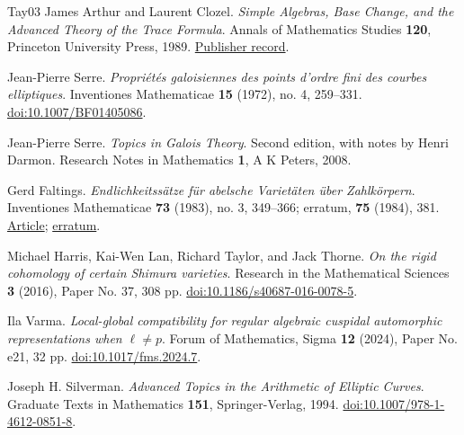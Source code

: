 \documentclass[11pt,a4paper]{article}
\numberwithin{equation}{section}
\begin{document}
\begin{thebibliography}{Tay03}
James Arthur and Laurent Clozel.
\emph{Simple Algebras, Base Change, and the Advanced Theory of the Trace Formula}.
Annals of Mathematics Studies \textbf{120}, Princeton University Press, 1989.
\href{https://www.jstor.org/stable/j.ctt1bd6kj6}{Publisher record}.

Jean-Pierre Serre.
\emph{Propriétés galoisiennes des points d'ordre fini des courbes elliptiques}.
Inventiones Mathematicae \textbf{15} (1972), no. 4, 259--331.
\href{https://doi.org/10.1007/BF01405086}{doi:10.1007/BF01405086}.

Jean-Pierre Serre.
\emph{Topics in Galois Theory}.
Second edition, with notes by Henri Darmon.
Research Notes in Mathematics \textbf{1}, A K Peters, 2008.

Gerd Faltings.
\emph{Endlichkeitssätze für abelsche Varietäten über Zahlkörpern}.
Inventiones Mathematicae \textbf{73} (1983), no. 3, 349--366; erratum, \textbf{75} (1984), 381.
\href{https://doi.org/10.1007/BF01388432}{Article};
\href{https://doi.org/10.1007/BF01388572}{erratum}.

Michael Harris, Kai-Wen Lan, Richard Taylor, and Jack Thorne.
\emph{On the rigid cohomology of certain Shimura varieties}.
Research in the Mathematical Sciences \textbf{3} (2016), Paper No. 37, 308 pp.
\href{https://doi.org/10.1186/s40687-016-0078-5}{doi:10.1186/s40687-016-0078-5}.

Ila Varma.
\emph{Local-global compatibility for regular algebraic cuspidal automorphic representations when \(\ell\neq p\)}.
Forum of Mathematics, Sigma \textbf{12} (2024), Paper No. e21, 32 pp.
\href{https://doi.org/10.1017/fms.2024.7}{doi:10.1017/fms.2024.7}.

Joseph H. Silverman.
\emph{Advanced Topics in the Arithmetic of Elliptic Curves}.
Graduate Texts in Mathematics \textbf{151}, Springer-Verlag, 1994.
\href{https://doi.org/10.1007/978-1-4612-0851-8}{doi:10.1007/978-1-4612-0851-8}.

\end{thebibliography}
\end{document}
